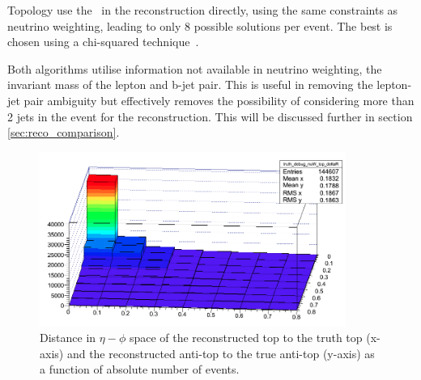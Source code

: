 Topology use the \etmiss\ in the reconstruction directly, using the same constraints as neutrino weighting, leading to only 8 possible solutions per event. The best is chosen using a chi-squared technique~\cite{whelicity}.

Both algorithms utilise information not available in neutrino weighting, the invariant mass of the lepton and b-jet pair. This is useful in removing the lepton-jet pair ambiguity but effectively removes the possibility of considering more than 2 jets in the event for the reconstruction. This will be discussed further in section \ref{sec:reco_comparison}.

\clearpage

\begin{figure}[htbp!]
	\begin{center}
	\includegraphics[width=100mm]{f/top_deltaR}
	\end{center}
	\caption{Distance in $\eta - \phi$ space of the reconstructed top to the truth top (x-axis) and the reconstructed anti-top to the true anti-top (y-axis) as a function of absolute number of events.}
	\label{fig:top_dr}
\end{figure}

